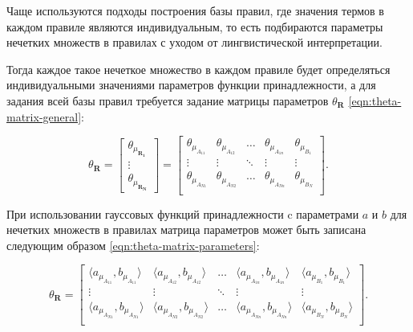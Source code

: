 

Чаще используются подходы построения базы правил, где значения термов в каждом правиле являются индивидуальным, то есть подбираются параметры нечетких множеств в правилах с уходом от лингвистической интерпретации.

Тогда каждое такое нечеткое множество в каждом правиле будет определяться индивидуальными значениями параметров функции принадлежности, а для задания всей базы правил требуется задание матрицы параметров $\theta_{\mathbf{R}}$ \eqref{eqn:theta-matrix-general}:

\begin{equation}
	\label{eqn:theta-matrix-general}
	\theta_{\mathbf{R}} = \begin{bmatrix}
		\theta_{\mu_{\mathbf{R_1}}}\\
		\vdots\\
		\theta_{\mu_{\mathbf{R_N}}}
	\end{bmatrix} = \begin{bmatrix}
		\theta_{\mu_{A_{11}}} & \theta_{\mu_{A_{12}}} & \dots & \theta_{\mu_{A_{1n}}} & \theta_{\mu_{B_{1}}} \\
		\vdots & \vdots & \ddots & \vdots & \vdots \\
		\theta_{\mu_{A_{N1}}} & \theta_{\mu_{A_{N2}}} & \dots & \theta_{\mu_{A_{Nn}}} & \theta_{\mu_{B_{N}}} \\
	\end{bmatrix}.
\end{equation}

При использовании гауссовых функций принадлежности c параметрами $a$ и $b$ для нечетких множеств в правилах матрица параметров может быть записана следующим образом \eqref{eqn:theta-matrix-parameters}:

\begin{equation}
	\label{eqn:theta-matrix-parameters}
	\theta_{\mathbf{R}} = \begin{bmatrix}
		\langle a_{\mu_{A_{11}}}, b_{\mu_{A_{11}}}\rangle & \langle a_{\mu_{A_{12}}}, b_{\mu_{A_{12}}}\rangle & \dots & \langle a_{\mu_{A_{1n}}}, b_{\mu_{A_{1n}}}\rangle & \langle a_{\mu_{B_{1}}}, b_{\mu_{B_{1}}}\rangle \\
		\vdots & \vdots & \ddots & \vdots & \vdots \\
		\langle a_{\mu_{A_{N1}}}, b_{\mu_{A_{N1}}}\rangle & \langle a_{\mu_{A_{N2}}}, b_{\mu_{A_{N2}}}\rangle & \dots & \langle a_{\mu_{A_{Nn}}}, b_{\mu_{A_{Nn}}}\rangle & \langle a_{\mu_{B_{N}}}, b_{\mu_{B_{N}}}\rangle \\
	\end{bmatrix}.
\end{equation}

